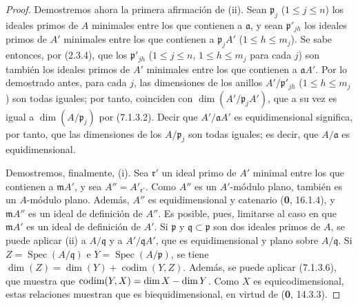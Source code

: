 \begin{proof}
Demostremos ahora la primera afirmación de (ii). Sean
$\mathfrak p_j$ ($1\leqslant j\leqslant n$) los ideales
primos de $A$ minimales entre los que contienen a
$\mathfrak a$, y sean $\mathfrak p'_{jh}$ los ideales
primos de $A'$ minimales entre los que contienen a
$\mathfrak p_jA'$ ($1\leqslant h\leqslant m_j$).
Se sabe entonces, por (2.3.4), que los
$\mathfrak p'_{jh}$ ($1\leqslant j\leqslant n$,
$1\leqslant h\leqslant
m_j$ para cada $j$) son también
los ideales primos de $A'$ minimales entre los que
contienen a $\mathfrak aA'$. Por lo demostrado antes,
para cada $j$, las dimensiones de los anillos
$A'/\mathfrak p'_{jh}$ ($1\leqslant h\leqslant m_j$)
son todas iguales; por tanto, coinciden con
$\dim(A'/\mathfrak p_jA')$, que a su vez es igual a
$\dim(A/\mathfrak p_j)$ por (7.1.3.2). Decir que
$A'/\mathfrak aA'$ es equidimensional significa,
por tanto, que las dimensiones de los $A/\mathfrak p_j$
son todas iguales; es decir, que $A/\mathfrak a$ es
equidimensional.

Demostremos, finalmente, (i). Sea $\mathfrak r'$ un
ideal primo de $A'$ minimal entre los que contienen a
$\mathfrak mA'$, y sea $A''=A'_{\mathfrak r'}$.
Como $A''$ es un $A'$-módulo plano, también es un
$A$-módulo plano. Además, $A''$ es equidimensional y
catenario (\textbf 0, 16.1.4), y $\mathfrak mA''$ es un ideal
de definición de $A''$. Es posible, pues, limitarse
al caso en que $\mathfrak mA'$ es un ideal de definición
de $A'$. Si $\mathfrak p$ y $\mathfrak q\subset\mathfrak p$
son dos ideales primos de $A$, se puede aplicar (ii)
a $A/\mathfrak q$ y a $A'/\mathfrak qA'$, que es
equidimensional y plano sobre $A/\mathfrak q$.
Si $Z=\operatorname{Spec}(A/\mathfrak q)$ e
$Y=\operatorname{Spec}(A/\mathfrak p)$, se tiene
$\dim(Z)=\dim(Y)+\operatorname{codim}(Y,Z)$.
Además, se puede aplicar (7.1.3.6), que muestra que
$\operatorname{codim}(Y,X)=\dim X-\dim Y$.
Como $X$ es equicodimensional, estas relaciones
muestran que es biequidimensional, en virtud de
(\textbf 0, 14.3.3).
\end{proof}
